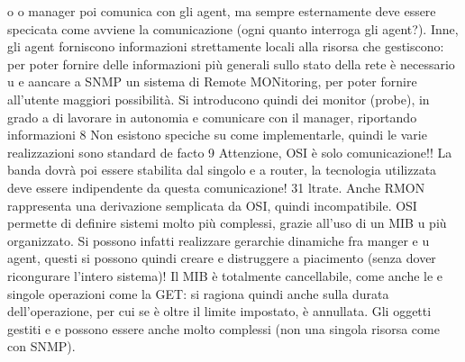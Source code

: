 \documentclass[a4paper,12pt]{article}
\begin{document}
o
o
manager poi comunica con gli agent, ma sempre esternamente deve essere specicata come avviene la comunicazione (ogni
quanto interroga gli agent?). Inne,
gli agent forniscono informazioni strettamente locali alla risorsa che gestiscono:
per poter fornire delle informazioni più generali sullo stato della rete è necessario
u
e
aancare a SNMP un sistema di Remote MONitoring, per poter fornire all'utente maggiori possibilità. Si introducono quindi
dei monitor (probe), in grado
a
di lavorare in autonomia e comunicare con il manager, riportando informazioni
8 Non esistono speciche su come implementarle, quindi le varie realizzazioni sono standard
de facto
9 Attenzione, OSI è solo comunicazione!! La banda dovrà poi essere stabilita dal singolo
e
a
router, la tecnologia utilizzata deve essere indipendente da questa comunicazione!
31
ltrate. Anche RMON rappresenta una derivazione semplicata da OSI, quindi
incompatibile.
OSI permette di definire sistemi molto più complessi, grazie all'uso di un MIB
u
più organizzato. Si possono infatti realizzare gerarchie dinamiche fra manger e
u
agent, questi si possono quindi creare e distruggere a piacimento (senza dover
ricongurare l'intero sistema)! Il MIB è totalmente cancellabile, come anche le
e
singole operazioni come la GET: si ragiona quindi anche sulla durata dell'operazione, per cui se è oltre il limite
impostato, è annullata. Gli oggetti gestiti
e
e
possono essere anche molto complessi (non una singola risorsa come con SNMP).
\end{document}
